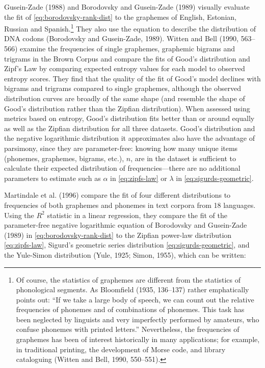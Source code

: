 Gusein-Zade (1988) and Borodovsky and Gusein-Zade (1989) visually evaluate the fit of \eqref{eq:borodovsky-rank-dist} to the graphemes of English, Estonian, Russian and Spanish.\footnote{Of course, the statistics of graphemes are different from the statistics of phonological segments. As Bloomfield (1935, 136--137) rather emphatically points out: ``If we take a large body of speech, we can count out the relative frequencies of phonemes and of combinations of phonemes. This task has been neglected by linguists and very imperfectly performed by amateurs, who confuse phonemes with printed letters.'' Nevertheless, the frequencies of graphemes has been of interest historically in many applications; for example, in traditional printing, the development of Morse code, and library cataloguing (Witten and Bell, 1990, 550--551).} They also use the equation to describe the distribution of DNA codons (Borodovsky and Gusein-Zade, 1989). Witten and Bell (1990, 563--566) examine the frequencies of single graphemes, graphemic bigrams and trigrams in the Brown Corpus and compare the fits of Good's distribution and Zipf's Law by comparing expected entropy values for each model to observed entropy scores. They find that the quality of the fit of Good's model declines with bigrams and trigrams compared to single graphemes, although the observed distribution curves are broadly of the same shape (and resemble the shape of Good's distribution rather than the Zipfian distribution). When assessed using metrics based on entropy, Good's distribution fits better than or around equally as well as the Zipfian distribution for all three datasets. Good's distribution and the negative logarithmic distribution it approximates also have the advantage of parsimony, since they are parameter-free: knowing how many unique items (phonemes, graphemes, bigrams, etc.), \(n\), are in the dataset is sufficient to calculate their expected distribution of frequencies---there are no additional parameters to estimate such as \(\alpha\) in \eqref{eq:zipfs-law} or \(\lambda\) in \eqref{eq:sigurds-geometric}.

Martindale et al. (1996) compare the fit of four different distributions to frequencies of both graphemes and phonemes in text corpora from 18 languages. Using the \(R^2\) statistic in a linear regression, they compare the fit of the parameter-free negative logarithmic equation of Borodovsky and Gusein-Zade (1989) in \eqref{eq:borodovsky-rank-dist} to the Zipfian power-law distribution \eqref{eq:zipfs-law}, Sigurd's geometric series distribution \eqref{eq:sigurds-geometric}, and the Yule-Simon distribution (Yule, 1925; Simon, 1955), which can be written:

